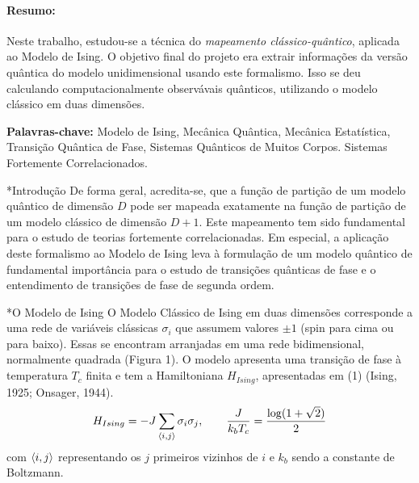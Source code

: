 \documentclass[plainsections, 32pt]{sciposter}
\makeatletter
\newcommand{\largo}{\fontsize{36}{40}\selectfont }
\renewcommand\section{\@startsection {section}{1}{\z@}{-1ex \@plus -0.5ex \@minus -.1ex}{0.8ex \@plus.1ex}{\largo\bfseries\fontsize{28}{26}\selectfont}}
\makeatother
\begin{document}
\vspace{1cm}
\begin{multicols}{2}
\paragraph{Resumo:} Neste trabalho, estudou-se a técnica do \textit{mapeamento clássico-quântico}, aplicada ao Modelo de Ising. O objetivo final do projeto era extrair informações da versão quântica do modelo unidimensional usando este formalismo. Isso se deu calculando computacionalmente observávais quânticos, utilizando o modelo clássico em duas dimensões.

\textbf{Palavras-chave:} Modelo de Ising, Mecânica Quântica, Mecânica Estatística, Transição Quântica de Fase, Sistemas Quânticos de Muitos Corpos. Sistemas Fortemente Correlacionados.

\section*{Introdução}
\vspace{-3mm}
De forma geral, acredita-se, que a função de partição de um modelo quântico de dimensão $D$ pode ser mapeada exatamente na função de partição de um modelo clássico de dimensão $D+1$.
Este mapeamento tem sido fundamental para o estudo de teorias fortemente correlacionadas. Em especial, a aplicação deste formalismo ao Modelo de Ising leva à formulação de um modelo quântico de fundamental importância para o estudo de transições quânticas de fase e o entendimento de transições de fase de segunda ordem.

\section*{O Modelo de Ising}
\vspace{-3mm}
O Modelo Clássico de Ising em duas dimensões corresponde a uma rede de variáveis clássicas $\sigma_i$ que assumem valores $\pm 1$ (spin para cima ou para baixo). Essas se encontram arranjadas em uma rede bidimensional, normalmente quadrada (Figura 1). O modelo apresenta uma transição de fase à temperatura $T_c$ finita e tem a Hamiltoniana $H_{Ising}$, apresentadas em (1) (Ising, 1925; Onsager, 1944).
\begin{equation}
  H_{Ising} = - J \sum_{\braket{i, j}} \sigma_i \sigma_j,
  \qquad \frac{J}{k_b T_c} = \frac{\log(1+\sqrt{2})}{2}
\end{equation}
com $\braket{i, j}$ representando os $j$ primeiros vizinhos de $i$ e $k_b$ sendo a constante de Boltzmann.


\end{multicols}
\end{document}
